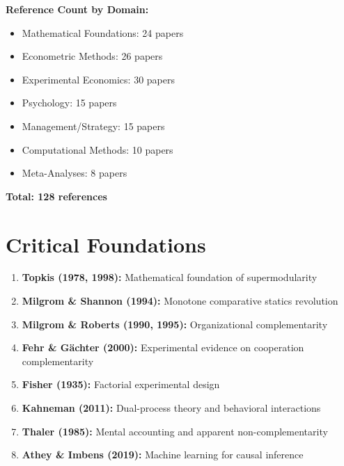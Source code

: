 \nocite{bcm_master}


\textbf{Reference Count by Domain:}
\begin{itemize}
    \item Mathematical Foundations: 24 papers
    \item Econometric Methods: 26 papers
    \item Experimental Economics: 30 papers
    \item Psychology: 15 papers
    \item Management/Strategy: 15 papers
    \item Computational Methods: 10 papers
    \item Meta-Analyses: 8 papers
\end{itemize}

\textbf{Total: 128 references}

\section{Critical Foundations}
\label{sec:critical-foundations}

\begin{enumerate}
    \item \textbf{Topkis (1978, 1998):} Mathematical foundation of supermodularity
    \item \textbf{Milgrom \& Shannon (1994):} Monotone comparative statics revolution
    \item \textbf{Milgrom \& Roberts (1990, 1995):} Organizational complementarity
    \item \textbf{Fehr \& Gächter (2000):} Experimental evidence on cooperation complementarity
    \item \textbf{Fisher (1935):} Factorial experimental design
    \item \textbf{Kahneman (2011):} Dual-process theory and behavioral interactions
    \item \textbf{Thaler (1985):} Mental accounting and apparent non-complementarity
    \item \textbf{Athey \& Imbens (2019):} Machine learning for causal inference
\end{enumerate}

